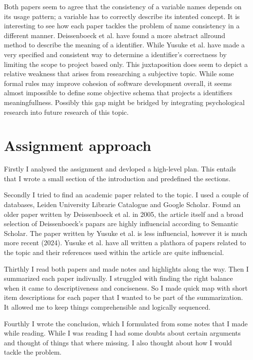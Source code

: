 \documentclass[a4paper,12pt]{article}
\begin{document}
Both papers seem to agree that the consistency of a variable names depends on its usage pattern; a variable has to correctly describe its intented concept. It is interesting to see how each paper tackles the problem of name consistency in a different manner. Deissenboeck et al. have found a more abstract allround method to describe the meaning of a identifier. While Yusuke et al. have made a very specified and consistent way to determine a identifier's correctness by limiting the scope to project based only. This juxtaposition does seem to depict a relative weakness that arises from researching a subjective topic. While some formal rules may improve cohesion of software development overall, it seems almost impossible to define some objective schema that projects a identifiers meaningfullness. Possibly this gap might be bridged by integrating psychological research into future research of this topic.




\section{Assignment approach}
Firstly I analysed the assignment and devloped a high-level plan. This entails that I wrote a small section of the introduction and predefined the sections. 

Secondly I tried to find an academic paper related to the topic. I used a couple of databases, Leiden University Librarie Catalogue and Google Scholar. Found an older paper written by Deissenboeck et al. in 2005, the article itself and a broad selection of Deissenboeck's papars are highly influencial according to Semantic Scholar. The paper written by Yusuke et al. is less influencial, however it is much more recent (2024). Yusuke et al. have all written a plathora of papers related to the topic and their references used within the article are quite influencial. 

Thirthly I read both papers and made notes and highlights along the way. Then I summarized each paper indivually. I struggled with finding the right balance when it came to descriptiveness and conciseness. So I made quick map with short item descriptions for each paper that I wanted to be part of the summarization. It allowed me to keep things comprehensible and logically sequenced. 

Fourthly I wrote the conclusion, which I formulated from some notes that I made while reading. While I was reading I had some doubts about certain arguments and thought of things that where missing. I also thought about how I would tackle the problem.







\end{document}
